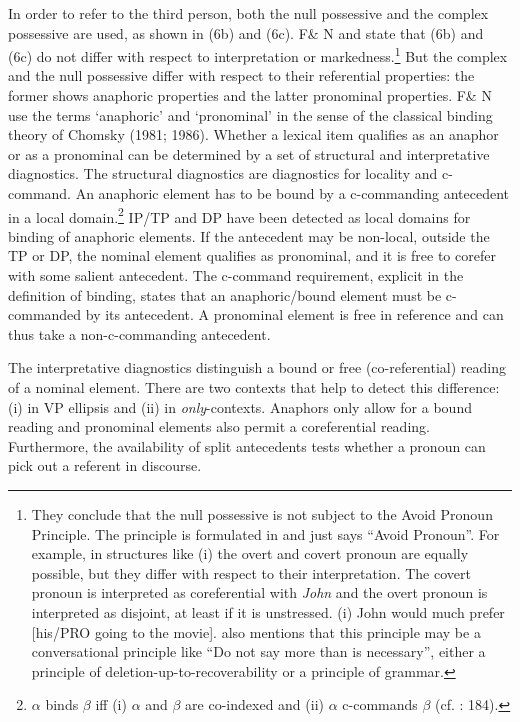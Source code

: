 \documentclass[output=paper]{langsci/langscibook}
\begin{document}
In order to refer to the third person, both the null possessive and the complex possessive are used, as shown in (6b) and (6c). F\& N and \citet{Rodrigues2010} state that (6b) and (6c) do not differ with respect to interpretation or markedness.\footnote{They conclude that the null possessive is not subject to the Avoid Pronoun Principle. The principle is formulated in \citet{Chomsky1981} and just says “Avoid Pronoun”. For example, in structures like (i) the overt and covert pronoun are equally possible, but they differ with respect to their interpretation. The covert pronoun is interpreted as coreferential with \textit{John} and the overt pronoun is interpreted as disjoint, at least if it is unstressed. (i) John would much prefer [his/PRO going to the movie]. \citep[65]{Chomsky1981}\citet[65]{Chomsky1981} also mentions that this principle may be a conversational principle like “Do not say more than is necessary”, either a principle of deletion-up-to-recoverability or a principle of grammar.} But the complex and the null possessive differ with respect to their referential properties: the former shows anaphoric properties and the latter pronominal properties. F\& N use the terms ‘anaphoric’ and ‘pronominal’ in the sense of the classical binding theory of Chomsky (1981; 1986). Whether a lexical item qualifies as an anaphor or as a pronominal can be determined by a set of structural and interpretative diagnostics. The structural diagnostics are diagnostics for locality and c-command. An anaphoric element has to be bound by a c-commanding antecedent in a local domain.\footnote{$\alpha $ binds $\beta $ iff (i) $\alpha $ and $\beta $ are co-indexed and (ii) $\alpha $ c-commands $\beta $ (cf. \citealt{Chomsky1981}: 184).} IP/TP and DP have been detected as local domains for binding of anaphoric elements. If the antecedent may be non-local, outside the TP or DP, the nominal element qualifies as pronominal, and it is free to corefer with some salient antecedent. The c-command requirement, explicit in the definition of binding, states that an anaphoric/bound element must be c-commanded by its antecedent. A pronominal element is free in reference and can thus take a non-c-commanding antecedent.

The interpretative diagnostics distinguish a bound or free (co-referential) reading of a nominal element. There are two contexts that help to detect this difference: (i) in VP ellipsis and (ii) in \textit{only}{}-contexts. Anaphors only allow for a bound reading and pronominal elements also permit a coreferential reading. Furthermore, the availability of split antecedents tests whether a pronoun can pick out a referent in discourse.
\end{document}
